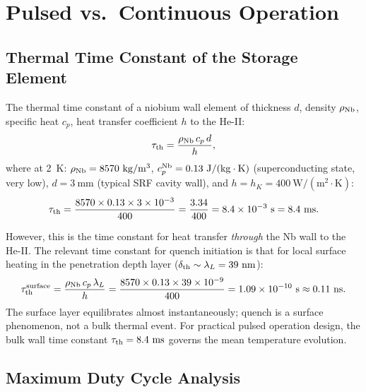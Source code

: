 \documentclass[aps,prd,twocolumn,superscriptaddress]{revtex4-2}
\begin{document}
\section{Pulsed vs.\ Continuous Operation}
\label{sec:pulsed}

\subsection{Thermal Time Constant of the Storage Element}

The thermal time constant of a niobium wall element of thickness $d$,
density $\rho_{\rm Nb}$, specific heat $c_p$, heat transfer coefficient
$h$ to the He-II:
\begin{equation}
\tau_{\rm th} = \frac{\rho_{\rm Nb}\,c_p\,d}{h},
\end{equation}
where at 2~K: $\rho_{\rm Nb} = 8570~\mathrm{kg/m^3}$,
$c_p^{\rm Nb} = 0.13~\mathrm{J/(kg\cdot K)}$ (superconducting state,
very low), $d = 3~\mathrm{mm}$ (typical SRF cavity wall), and
$h = h_K = 400~\mathrm{W/(m^2\cdot K)}$:
\begin{equation}
\tau_{\rm th} = \frac{8570\times 0.13\times 3\times 10^{-3}}{400}
= \frac{3.34}{400} = 8.4\times 10^{-3}~\mathrm{s} = 8.4~\mathrm{ms}.
\end{equation}

However, this is the time constant for heat transfer \emph{through} the
Nb wall to the He-II.  The relevant time constant for quench initiation
is that for local surface heating in the penetration depth layer
($\delta_{\rm th} \sim \lambda_L = 39~\mathrm{nm}$):
\begin{equation}
\tau_{\rm th}^{\rm surface} = \frac{\rho_{\rm Nb}\,c_p\,\lambda_L}{h}
= \frac{8570\times 0.13\times 39\times 10^{-9}}{400}
= 1.09\times 10^{-10}~\mathrm{s} \approx 0.11~\mathrm{ns}.
\end{equation}
The surface layer equilibrates almost instantaneously; quench is a
surface phenomenon, not a bulk thermal event.  For practical pulsed
operation design, the bulk wall time constant $\tau_{\rm th} = 8.4~\mathrm{ms}$
governs the mean temperature evolution.

\subsection{Maximum Duty Cycle Analysis}
\end{document}
